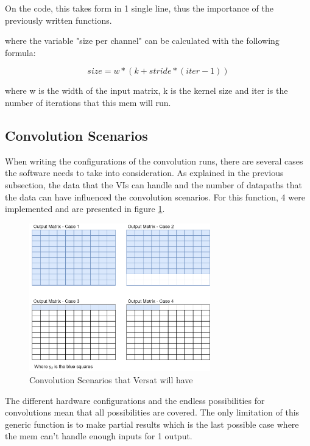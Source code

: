 On the code, this takes form in 1 single line, thus the importance of the previously written functions.



where the variable "size per channel" can be calculated with the following formula:

\[ size=w*(k+stride*(iter-1)) \]

where w is the width of the input matrix, k is the kernel size and iter is the number of iterations that this mem will run.

\subsection{Convolution Scenarios}
\label{ConvolutionScenarios}

When writing the configurations of the convolution runs, there are several cases the software needs to take into consideration.
As explained in the previous subsection, the data that the VIs can handle and the number of datapaths that the data can have influenced
the convolution scenarios. For this function, 4 were implemented and are presented in figure \ref{ConvScenarioss}.

\begin{figure}[!htbp]
    \centering
    \includegraphics[width=0.7\textwidth]{Figures/Variables.drawio.png}
    \caption{Convolution Scenarios that Versat will have}
    \label{ConvScenarioss}
\end{figure}

The different hardware configurations and the endless possibilities for convolutions mean that all possibilities are covered. 
The only limitation of this generic function is to make partial results which is the last possible case where the mem can't handle enough inputs for 
1 output.

